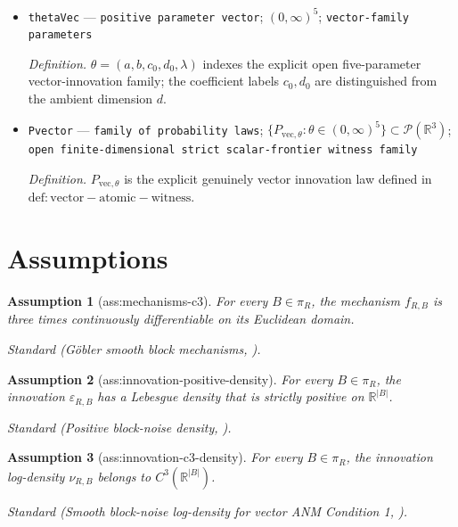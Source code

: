 \documentclass{article}
\newtheorem{assumption}{Assumption}
\begin{document}
\begin{itemize}
  \par\smallskip\noindent\emph{Definition.} For a random vector \(Z\) with a positive joint density and a split \(C\mathbin{\dot\cup}D\), \(\varphi_{D\mid C=c}\) is any regular version of the conditional characteristic function, defined for marginal-almost-every \(c\).
  \item \texttt{thetaVec} --- \texttt{positive parameter vector}; \((0,\infty)^5\); \texttt{vector-\allowbreak{}family parameters}
  \par\smallskip\noindent\emph{Definition.} \(\theta=(a,b,c_0,d_0,\lambda)\) indexes the explicit open five-parameter vector-innovation family; the coefficient labels \(c_0,d_0\) are distinguished from the ambient dimension \(d\).
  \item \texttt{Pvector} --- \texttt{family of probability laws}; \(\{P_{\mathrm{vec},\theta}:\theta\in(0,\infty)^5\}\subset\mathcal P(\mathbb R^3)\); \texttt{open finite-\allowbreak{}dimensional strict scalar-\allowbreak{}frontier witness family}
  \par\smallskip\noindent\emph{Definition.} \(P_{\mathrm{vec},\theta}\) is the explicit genuinely vector innovation law defined in \(\mathrm{def:vector-atomic-witness}\).
\end{itemize}

\section{Assumptions}

\begin{assumption}[ass:mechanisms-c3]\label{ass:mechanisms-c3}
For every \(B\in\pi_R\), the mechanism \(f_{R,B}\) is three times continuously differentiable on its Euclidean domain.
\par\smallskip\noindent\emph{Standard} (Göbler smooth block mechanisms, \cite{GoblerWindischDrton2025}).
\end{assumption}

\begin{assumption}[ass:innovation-positive-density]\label{ass:innovation-positive-density}
For every \(B\in\pi_R\), the innovation \(\varepsilon_{R,B}\) has a Lebesgue density that is strictly positive on \(\mathbb R^{|B|}\).
\par\smallskip\noindent\emph{Standard} (Positive block-noise density, \cite{GoblerWindischDrton2025}).
\end{assumption}

\begin{assumption}[ass:innovation-c3-density]\label{ass:innovation-c3-density}
For every \(B\in\pi_R\), the innovation log-density \(\nu_{R,B}\) belongs to \(C^3(\mathbb R^{|B|})\).
\par\smallskip\noindent\emph{Standard} (Smooth block-noise log-density for vector ANM Condition 1, \cite{GoblerWindischDrton2025}).
\end{assumption}
\end{document}

